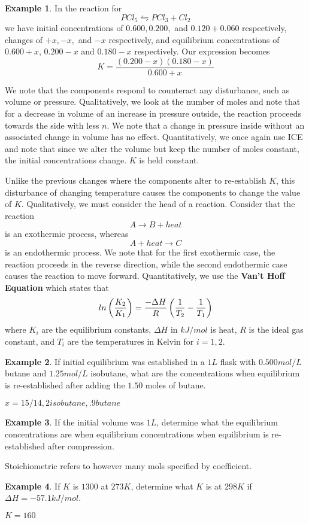 \documentclass[11pt]{article}
\theoremstyle{plain} %
\theoremstyle{definition}
\theoremstyle{example}
\newtheorem*{example}{Example}
\theoremstyle{remark}
\begin{document}
\begin{example}
In the reaction for 
$$PCl_5 \leftrightharpoons PCl_3 + Cl_2$$
we have initial concentrations of $0.600, 0.200,$ and $0.120+0.060$ respectively, changes of $+x, -x,$ and $-x$ respectively, and equilibrium concentrations of $0.600 + x$, $0.200 -x$ and $0.180 -x$ respectively. Our expression becomes 
$$K = \frac{(0.200-x)(0.180-x)}{0.600+x}$$
\end{example}

We note that the components respond to counteract any disturbance, such as volume or pressure. Qualitatively, we look at the number of moles and note that for a decrease in volume of an increase in pressure outside, the reaction proceeds towards the side with less $n$. We note that a change in pressure inside without an associated change in volume has no effect. Quantitatively, we once again use ICE and note that since we alter the volume but keep the number of moles constant, the initial concentrations change. $K$ is held constant.

Unlike the previous changes where the components alter to re-establish $K$, this disturbance of changing temperature causes the components to change the value of $K$. Qualitatively, we must consider the head of a reaction. Consider that the reaction $$A \rightarrow B + heat$$ is an exothermic process, whereas $$A + heat \rightarrow C$$ is an endothermic process. We note that for the first exothermic case, the reaction proceeds in the reverse direction, while the second endothermic case causes the reaction to move forward. Quantitatively, we use the \textbf{Van't Hoff Equation} which states that
$$\\ln\left(\frac{K_2}{K_1}\right) = \frac{-\Delta H}{R} \left(\frac{1}{T_2} - \frac{1}{T_1}\right)$$
where $K_i$ are the equilibrium constants, $\Delta H$ in $kJ/mol$ is heat, $R$ is the ideal gas constant, and $T_i$ are the temperatures in Kelvin for $i = 1,2$.

\begin{example}
If initial equilibrium was established in a $1L$ flask with $0.500 mol/L$ butane and $1.25 mol/L$ isobutane, what are the concentrations when equilibrium is re-established after adding the $1.50$ moles of butane. 
\end{example}

$x = 15/14, 2 isobutane, .9 butane$
\begin{example}
If the initial volume was $1L$, determine what the equilibrium concentrations are when equilibrium concentrations when equilibrium is re-established after compression.
\end{example}
Stoichiometric refers to however many mols specified by coefficient. 
\begin{example}
If $K$ is $1300$ at $273 K$, determine what $K$ is at $298 K$ if $\Delta H = -57.1kJ/mol$.
\end{example}
$K=160$
\end{document}
